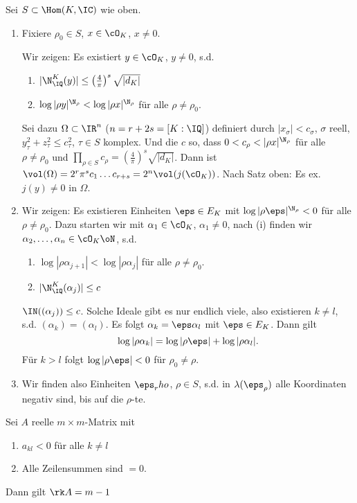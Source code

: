\renewcommand{\lecdate}{02.12.2014}

\begin{Beweis}
 Sei $S\subset \Hom(K,\IC)$ wie oben.
 \begin{enumerate}
  \item Fixiere $\rho_0\in S$, $x\in\cO_K$, $x\neq 0$.
  
  Wir zeigen: Es existiert $y\in\cO_K$, $y\neq 0$, s.d. 
  \begin{enumerate}
   \item $|\N_\IQ^K(y)|\leq \left(\frac{4}{\pi}\right)^s\sqrt{|d_K|}$
   \item $\log |\rho y|^{\N_\rho} < \log|\rho x|^{\N_\rho}$ für alle $\rho\neq\rho_0$.
  \end{enumerate}
  Sei dazu $\Omega\subset\IR^n$ ($n=r+2s=[K:\IQ]$) definiert durch $|x_\sigma|<c_\sigma$, $\sigma$ reell, $y_\tau^2+z_\tau^2\leq c_\tau^2$, $\tau\in S$ komplex. Und die $c$ so, dass $0<c_\rho<|\rho x|^{\N_\rho}$ für alle $\rho\neq\rho_0$ und $\prod_{\rho\in S} c_\rho = \left(\frac{4}{\pi}\right)^s\sqrt{|d_K|}$. Dann ist $\vol(\Omega)=2^r\pi^sc_1\ldots c_{r+s}=2^n\vol(j(\cO_K))$. Nach Satz oben: Es ex. $j(y)\neq 0$ in $\Omega$.
  \item Wir zeigen: Es existieren Einheiten $\eps\in E_K$ mit $\log|\rho\eps|^{\N_\rho}<0$ für alle $\rho\neq\rho_0$. Dazu starten wir mit $\alpha_1\in\cO_K$, $\alpha_1\neq 0$, nach (i) finden wir $\alpha_2,\ldots,\alpha_n\in\cO_K\oN$, s.d.
  \begin{enumerate}
   \item $\log|\rho\alpha_{j+1}|<\log|\rho\alpha_j| $ für alle $\rho\neq\rho_0$.
   \item $|\N_\IQ^K(\alpha_j)|\leq c$
  \end{enumerate}
  \folge $\IN((\alpha_j))\leq c$. Solche Ideale gibt es nur endlich viele, also existieren $k\neq l$, s.d. $(\alpha_k)=(\alpha_l)$. Es folgt $\alpha_k=\eps\alpha_l$ mit $\eps\in E_K$. Dann gilt \[\log|\rho\alpha_k|=\log|\rho\eps|+\log|\rho\alpha_l|. \] Für $k>l$ folgt $\log|\rho\eps|<0$ für $\rho_0\neq\rho$.
  \item Wir finden also Einheiten $\eps_rho$, $\rho\in S$, s.d. in $\lambda(\eps_\rho)$ alle Koordinaten negativ sind, bis auf die $\rho$-te.
 \end{enumerate}
  \end{Beweis}

  \begin{Lemma}
   Sei $A$ reelle $m\times m$-Matrix mit
   \begin{enumerate}
    \item $a_{kl}<0$ für alle $k\neq l$
    \item Alle Zeilensummen sind $=0$.
   \end{enumerate}
  Dann gilt $\rk A=m-1$
  \end{Lemma}

